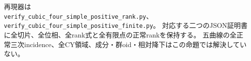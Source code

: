 再現器は\\
\texttt{verify\_cubic\_four\_simple\_positive\_rank.py}、\\
\texttt{verify\_cubic\_four\_simple\_positive\_finite.py}。
対応する二つのJSON証明書に全切片、全位相、全rank式と全有限点の正常rankを保持する。
五曲線の全正常三次incidence、全CY領域、成分・群oid・相対降下はこの命題では解決していない。
